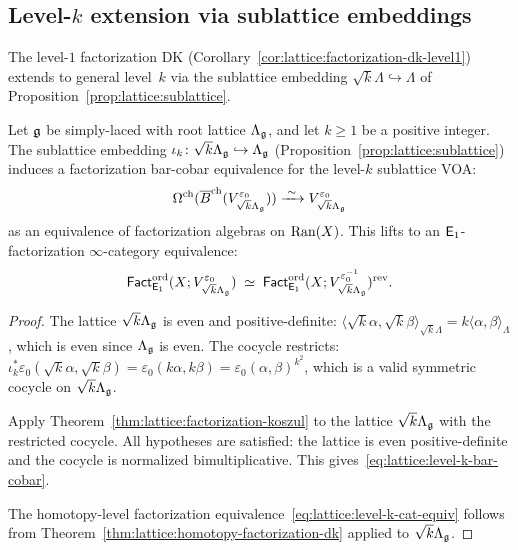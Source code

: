 \subsection{Level-$k$ extension via sublattice embeddings}

The level-$1$ factorization DK
(Corollary~\ref{cor:lattice:factorization-dk-level1}) extends to
general level~$k$ via the sublattice embedding
$\sqrt{k}\Lambda \hookrightarrow \Lambda$ of
Proposition~\ref{prop:lattice:sublattice}.

\begin{proposition}
\label{prop:lattice:level-k-factorization}
Let $\mathfrak{g}$ be simply-laced with root lattice $\Lambda_{\mathfrak{g}}$, and
let $k \geq 1$ be a positive integer.  The sublattice embedding
$\iota_k \colon \sqrt{k}\Lambda_{\mathfrak{g}} \hookrightarrow \Lambda_{\mathfrak{g}}$
\textup{(}Proposition~\textup{\ref{prop:lattice:sublattice})} induces
a factorization bar-cobar equivalence for the level-$k$
sublattice VOA:
\begin{equation}\label{eq:lattice:level-k-bar-cobar}
\Omega^{\mathrm{ch}}(
  \overline{B}^{\mathrm{ch}}(V_{\sqrt{k}\Lambda_{\mathfrak{g}}}^{\varepsilon_0}))
\xrightarrow{\;\sim\;}
V_{\sqrt{k}\Lambda_{\mathfrak{g}}}^{\varepsilon_0}
\end{equation}
as an equivalence of factorization algebras on $\operatorname{Ran}(X)$.  This
lifts to an $\mathsf{E}_1$-factorization $\infty$-category equivalence:
\begin{equation}\label{eq:lattice:level-k-cat-equiv}
\mathsf{Fact}_{\mathsf{E}_1}^{\mathrm{ord}}(X; V_{\sqrt{k}\Lambda_{\mathfrak{g}}}^{\varepsilon_0})
\;\simeq\;
\mathsf{Fact}_{\mathsf{E}_1}^{\mathrm{ord}}(X;
  V_{\sqrt{k}\Lambda_{\mathfrak{g}}}^{\varepsilon_0^{-1}})^{\mathrm{rev}}.
\end{equation}
\end{proposition}

\begin{proof}
The lattice $\sqrt{k}\Lambda_{\mathfrak{g}}$ is even and positive-definite:
$\langle\sqrt{k}\alpha,\sqrt{k}\beta\rangle_{\sqrt{k}\Lambda}
= k\langle\alpha,\beta\rangle_\Lambda$, which is even since
$\Lambda_{\mathfrak{g}}$ is even.  The cocycle restricts:
$\iota_k^*\varepsilon_0(\sqrt{k}\alpha,\sqrt{k}\beta) =
\varepsilon_0(k\alpha,k\beta) =
\varepsilon_0(\alpha,\beta)^{k^2}$, which is a valid symmetric
cocycle on $\sqrt{k}\Lambda_{\mathfrak{g}}$.

Apply Theorem~\ref{thm:lattice:factorization-koszul} to the
lattice $\sqrt{k}\Lambda_{\mathfrak{g}}$ with the restricted cocycle.  All
hypotheses are satisfied: the lattice is even positive-definite
and the cocycle is normalized bimultiplicative.  This
gives~\eqref{eq:lattice:level-k-bar-cobar}.

The homotopy-level factorization equivalence~\eqref{eq:lattice:level-k-cat-equiv} follows
from Theorem~\ref{thm:lattice:homotopy-factorization-dk} applied
to $\sqrt{k}\Lambda_{\mathfrak{g}}$.
\end{proof}


